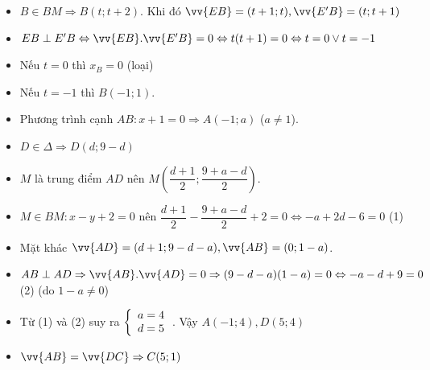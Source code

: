\begin{itemize}[label=,leftmargin=*]
\item $B\in BM\Rightarrow B(t;t+2)$. Khi đó $\vv{EB}=(t+1;t),\vv{E'B}=(t;t+1)$
\item $EB\perp E'B\Leftrightarrow \vv{EB}.\vv{E'B}=0\Leftrightarrow t(t+1)=0 \Leftrightarrow t=0 \vee t=-1$
\item Nếu $t=0$ thì $x_B=0$ (loại)
\item Nếu $t=-1$ thì $B(-1;1)$. 
\item Phương trình cạnh $AB:x+1=0\Rightarrow A(-1;a)$ ($a\ne 1$).
\item $D\in\Delta \Rightarrow D(d;9-d)$
\item $M$ là trung điểm $AD$ nên $M\left(\dfrac{d+1}{2};\dfrac{9+a-d}{2} \right)$.
\item $M \in BM:x-y+2=0$ nên $\dfrac{d+1}{2}-\dfrac{9+a-d}{2}+2=0\Leftrightarrow -a+2d-6=0$ (1)
\item Mặt khác $\vv{AD}=(d+1;9-d-a),\vv{AB}=(0;1-a)$.
\item $AB\perp AD\Rightarrow \vv{AB}.\vv{AD}=0\Rightarrow (9-d-a)(1-a)=0 \Leftrightarrow -a-d+9=0$ (2) (do $1-a\ne 0$)
\item Từ (1) và (2) suy ra $\left\{\begin{array}{ll}a=4 \\ d=5\end{array}\right.$. Vậy $A(-1;4),D(5;4)$
\item $\vv{AB}=\vv{DC}\Rightarrow C(5;1)$
\end{itemize}

